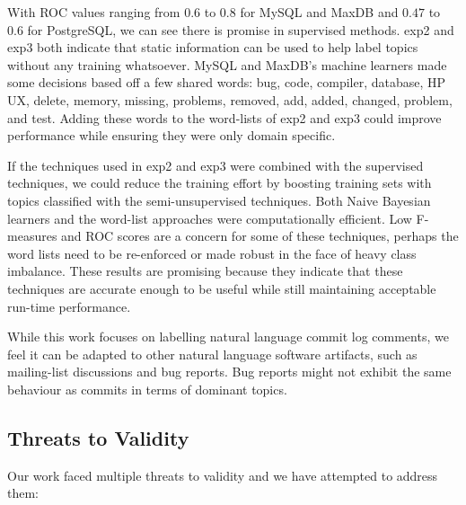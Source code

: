 \documentclass[smallextended]{svjour3}       %
\begin{document}
With ROC values ranging from $0.6$ to $0.8$ for MySQL and MaxDB and
$0.47$ to $0.6$ for PostgreSQL, we can see there is promise in supervised methods.
\textsf{exp2} and \textsf{exp3} both indicate that static information can be used to help label topics without any training whatsoever. 
MySQL and MaxDB's machine learners made some decisions based off a few shared words: \textsf{bug, code, compiler, database, HP UX, delete, memory,
missing, problems, removed, add, added, changed, problem, and test}. 
Adding these words to the word-lists of \textsf{exp2} and \textsf{exp3} could improve performance while ensuring they were only domain specific.

If the techniques used in \textsf{exp2} and \textsf{exp3} were combined with the supervised techniques, we could reduce the training effort by boosting
training sets with topics classified with the semi-unsupervised techniques.
Both Naive Bayesian learners and the word-list approaches were computationally efficient.  
Low F-measures and ROC scores are a concern for some of these
techniques, perhaps the word lists need to be re-enforced or made
robust in the face of heavy class imbalance.
These results are promising because they indicate that these
techniques are accurate enough to be useful while still maintaining
acceptable run-time performance.

While this work focuses on labelling natural language commit log
comments, we feel it can be adapted to other natural language software artifacts, 
such as mailing-list discussions and bug reports. Bug reports might not exhibit the same
behaviour as commits in terms of dominant topics.

\subsection{Threats to Validity}

Our work faced multiple threats to validity and we have attempted to address them:
\end{document}
